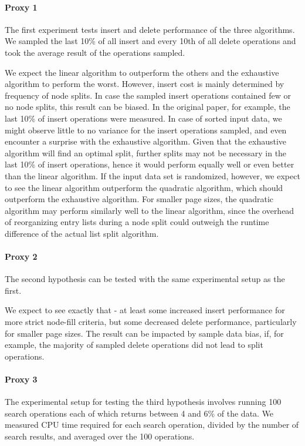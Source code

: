 \paragraph{Proxy 1}
The first experiment tests insert and delete performance of the three algorithms. We sampled the last 10\% of all insert and every 10th of all delete operations and took the average result of the operations sampled. 

We expect the linear algorithm to outperform the others and the exhaustive algorithm to perform the worst. However, insert cost is mainly determined by frequency of node splits. In case the sampled insert operations contained few or no node splits, this result can be biased. In the original paper, for example, the last 10\% of insert operations were measured.
In case of sorted input data, we might observe little to no variance for the insert operations sampled, and even encounter a surprise with the exhaustive algorithm. Given that the exhaustive algorithm will find an optimal split, further splits may not be necessary in the last 10\% of insert operations, hence it would perform equally well or even better than the linear algorithm. If the input data set is randomized, however, we expect to see the linear algorithm outperform the quadratic algorithm, which should outperform the exhaustive algorithm. For smaller page sizes, the quadratic algorithm may perform similarly well to the linear algorithm, since the overhead of reorganizing entry lists during a node split could outweigh the runtime difference of the actual list split algorithm.

\paragraph{Proxy 2}
The second hypothesis can be tested with the same experimental setup as the first.

We expect to see exactly that - at least some increased insert performance for more strict node-fill criteria, but some decreased delete performance, particularly for smaller page sizes. The result can be impacted by sample data bias, if, for example, the majority of sampled delete operations did not lead to split operations. 

\paragraph{Proxy 3}
The experimental setup for testing the third hypothesis involves running 100 search operations each of which returns between 4 and 6\% of the data. We measured CPU time required for each search operation,  divided by the number of search results, and averaged over the 100 operations. 

